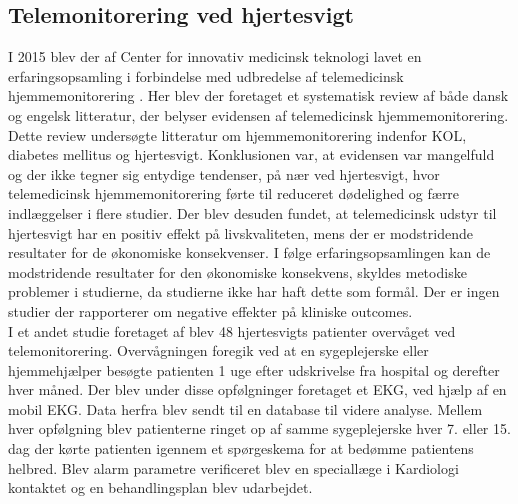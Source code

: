 \subsection{Telemonitorering ved hjertesvigt} 
I 2015 blev der af Center for innovativ medicinsk teknologi lavet en erfaringsopsamling i forbindelse med udbredelse af telemedicinsk hjemmemonitorering \citep{erfaringsopsamlingTelemedicin}. Her blev der foretaget et systematisk review af både dansk og engelsk litteratur, der belyser evidensen af telemedicinsk hjemmemonitorering. Dette review undersøgte litteratur om hjemmemonitorering indenfor KOL, diabetes mellitus og hjertesvigt. Konklusionen var, at evidensen var mangelfuld og der ikke tegner sig entydige tendenser, på nær ved hjertesvigt, hvor telemedicinsk hjemmemonitorering førte til reduceret dødelighed og færre indlæggelser i flere studier. Der blev desuden fundet, at telemedicinsk udstyr til hjertesvigt har en positiv effekt på livskvaliteten, mens der er modstridende resultater for de økonomiske konsekvenser. I følge erfaringsopsamlingen kan de modstridende resultater for den økonomiske konsekvens, skyldes metodiske problemer i studierne, da studierne ikke har haft dette som formål. Der er ingen studier der rapporterer om negative effekter på kliniske outcomes. \citep{erfaringsopsamlingTelemedicin}\\
I et andet studie foretaget af \citet{teleprog} blev 48 hjertesvigts patienter overvåget ved telemonitorering. Overvågningen foregik ved at en sygeplejerske eller hjemmehjælper besøgte patienten 1 uge efter udskrivelse fra hospital og derefter hver måned. Der blev under disse opfølgninger foretaget et EKG, ved hjælp af en mobil EKG. Data herfra blev sendt til en database til videre analyse. Mellem hver opfølgning blev patienterne ringet op af samme sygeplejerske hver 7. eller 15. dag der kørte patienten igennem et spørgeskema for at bedømme patientens helbred. Blev alarm parametre verificeret blev en speciallæge i Kardiologi kontaktet og en behandlingsplan blev udarbejdet. \citep{teleprog} 
